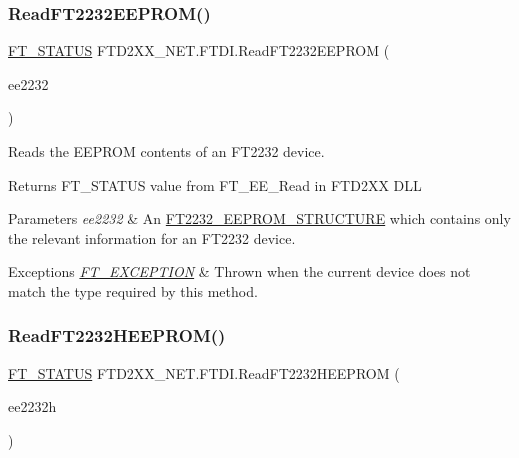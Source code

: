 \subsubsection{\texorpdfstring{ReadFT2232EEPROM()}{ReadFT2232EEPROM()}}
{\footnotesize\ttfamily \mbox{\hyperlink{class_f_t_d2_x_x___n_e_t_1_1_f_t_d_i_aabe20ad905cc4ccc1e35dd5b877d9a83}{F\+T\+\_\+\+S\+T\+A\+T\+US}} F\+T\+D2\+X\+X\+\_\+\+N\+E\+T.\+F\+T\+D\+I.\+Read\+F\+T2232\+E\+E\+P\+R\+OM (\begin{DoxyParamCaption}\item[{\mbox{\hyperlink{class_f_t_d2_x_x___n_e_t_1_1_f_t_d_i_1_1_f_t2232___e_e_p_r_o_m___s_t_r_u_c_t_u_r_e}{F\+T2232\+\_\+\+E\+E\+P\+R\+O\+M\+\_\+\+S\+T\+R\+U\+C\+T\+U\+RE}}}]{ee2232 }\end{DoxyParamCaption})}



Reads the E\+E\+P\+R\+OM contents of an F\+T2232 device. 

\begin{DoxyReturn}{Returns}
F\+T\+\_\+\+S\+T\+A\+T\+US value from F\+T\+\_\+\+E\+E\+\_\+\+Read in F\+T\+D2\+XX D\+LL
\end{DoxyReturn}

\begin{DoxyParams}{Parameters}
{\em ee2232} & An \mbox{\hyperlink{class_f_t_d2_x_x___n_e_t_1_1_f_t_d_i_1_1_f_t2232___e_e_p_r_o_m___s_t_r_u_c_t_u_r_e}{F\+T2232\+\_\+\+E\+E\+P\+R\+O\+M\+\_\+\+S\+T\+R\+U\+C\+T\+U\+RE}} which contains only the relevant information for an F\+T2232 device.\\
\hline
\end{DoxyParams}

\begin{DoxyExceptions}{Exceptions}
{\em \mbox{\hyperlink{class_f_t_d2_x_x___n_e_t_1_1_f_t_d_i_1_1_f_t___e_x_c_e_p_t_i_o_n}{F\+T\+\_\+\+E\+X\+C\+E\+P\+T\+I\+ON}}} & Thrown when the current device does not match the type required by this method.\\
\hline
\end{DoxyExceptions}
\mbox{\label{class_f_t_d2_x_x___n_e_t_1_1_f_t_d_i_ab8a4354ef365e048e1126cbe2e1fabbc}} 
\subsubsection{\texorpdfstring{ReadFT2232HEEPROM()}{ReadFT2232HEEPROM()}}
{\footnotesize\ttfamily \mbox{\hyperlink{class_f_t_d2_x_x___n_e_t_1_1_f_t_d_i_aabe20ad905cc4ccc1e35dd5b877d9a83}{F\+T\+\_\+\+S\+T\+A\+T\+US}} F\+T\+D2\+X\+X\+\_\+\+N\+E\+T.\+F\+T\+D\+I.\+Read\+F\+T2232\+H\+E\+E\+P\+R\+OM (\begin{DoxyParamCaption}\item[{\mbox{\hyperlink{class_f_t_d2_x_x___n_e_t_1_1_f_t_d_i_1_1_f_t2232_h___e_e_p_r_o_m___s_t_r_u_c_t_u_r_e}{F\+T2232\+H\+\_\+\+E\+E\+P\+R\+O\+M\+\_\+\+S\+T\+R\+U\+C\+T\+U\+RE}}}]{ee2232h }\end{DoxyParamCaption})}



